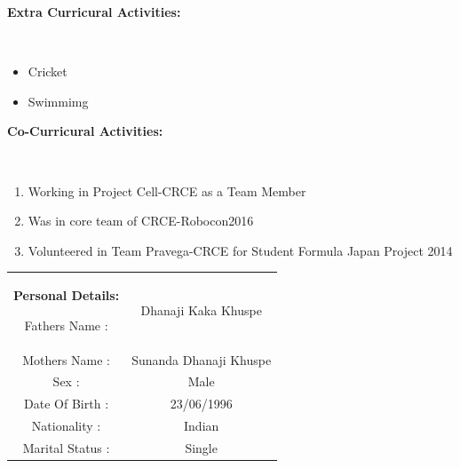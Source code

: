 \documentclass[a4paper]{article}
\begin{document}
\begin{flushleft}
				\begin{Large}\vspace{0.1in}\textbf{Extra Curricural Activities:}\end{Large}\\
				\begin{itemize}
					\item Cricket
					\item Swimmimg
				\end{itemize}
				
			\begin{Large}\vspace{0.1in}\textbf{Co-Curricural Activities:}\end{Large}\\
			\begin{enumerate}
					\item Working in Project Cell-CRCE as a Team Member
					\item Was in core team of CRCE-Robocon2016
					\item Volunteered in Team Pravega-CRCE for Student Formula Japan Project 2014
			\end{enumerate}
			

			\begin{tabular}{ cc }
				\begin{Large}\vspace{0.1in}\textbf{Personal Details:}\end{Large}
				\hfill Fathers Name : & Dhanaji Kaka Khuspe \\ 
				\hfill Mothers Name : & Sunanda Dhanaji Khuspe \\  
				\hfill Sex : & Male   \\ 
				\hfill Date Of Birth : & 23/06/1996  \\
				\hfill Nationality : & Indian  \\
				\hfill Marital Status : & Single
			\end{tabular}
				
				


			


    	
  	
 	
 	
 	
 \end{flushleft}

	

	
\end{document}
